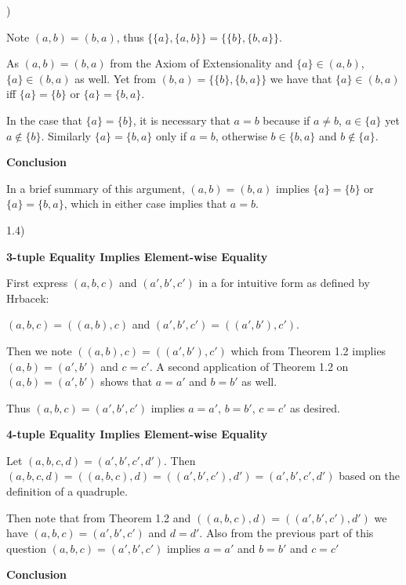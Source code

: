 \documentclass{article}
\begin{document}
)

\medskip

Note $(a,b) = (b,a)$, thus $\{\{a\},\{a,b\}\} = \{\{b\},\{b,a\}\}$. 

\medskip

As $(a,b) = (b,a)$ from the Axiom of Extensionality and $\{a\} \in (a,b)$, $\{a\} \in (b,a)$ as well. Yet from $(b,a) = \{\{b\},\{b,a\}\}$ we have that $\{a\} \in (b,a)$ iff $\{a\} = \{b\}$ or $\{a\} = \{b,a\}$.

\medskip
In the case that $\{a\} = \{b\}$, it is necessary that $a = b$ because if $a \neq b$, $a \in \{a\}$ yet $a \notin \{b\}$. Similarly $\{a\} = \{b,a\}$ only if $a = b$, otherwise $b \in \{b,a\}$ and $b \notin \{a\}$. 

\medskip
\textbf{Conclusion}
\medskip

In a brief summary of this argument, $(a,b) = (b,a)$ implies $\{a\} = \{b\}$ or $\{a\} = \{b,a\}$, which in either case implies that $a = b$. 

\bigskip

1.4) 

\bigskip
\textbf{3-tuple Equality Implies Element-wise Equality}
\bigskip

First express $(a,b,c)$ and $(a',b',c')$ in a for intuitive form as defined by Hrbacek:

$(a,b,c) = ((a,b),c)$ and $(a',b',c') = ((a',b'),c')$.

\medskip

Then we note $((a,b),c) = ((a',b'),c')$ which from Theorem 1.2 implies $(a,b) = (a',b')$ and $c = c'$. A second application of Theorem 1.2 on $(a,b) = (a',b')$ shows that $a = a'$ and $b = b'$ as well. 

\medskip

Thus $(a,b,c) = (a',b',c')$ implies $a = a'$, $b = b'$, $c = c'$ as desired.

\bigskip
\textbf{4-tuple Equality Implies Element-wise Equality}
\bigskip

Let $(a,b,c,d) = (a',b',c',d')$. Then $(a,b,c,d) = ((a,b,c),d) = ((a',b',c'),d') = (a',b',c',d')$ based on the definition of a quadruple.

\medskip

Then note that from Theorem 1.2 and $((a,b,c),d) = ((a',b',c'),d')$ we have $(a,b,c) = (a',b',c')$ and $d = d'$. Also from the previous part of this question $(a,b,c) = (a',b',c')$ implies $a = a'$ and $b = b'$ and $c = c'$

\medskip
\textbf{Conclusion}
\medskip
\end{document}
